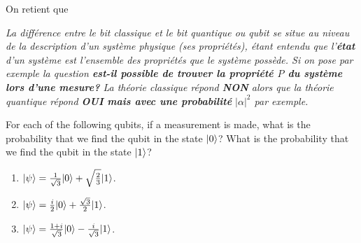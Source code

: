 On retient que

\medskip
\colorbox[gray]{0.8}{
\parbox[c]{0.9\textwidth}{
\emph{La différence entre le bit classique et le bit quantique ou qubit se situe
au niveau de la description d'un système physique (ses propriétés), étant
entendu que l'\textbf{état} d'un système est l'ensemble des propriétés que le
système possède. Si on pose par exemple la question \textbf{est-il possible de
trouver la propriété $P$ du système lors d'une mesure?} La théorie classique
répond \textbf{NON} alors que la théorie quantique répond \textbf{OUI mais avec
une probabilité} $|\alpha|^{2}$ par exemple.}
}}


\begin{exercise}
For each of the following qubits, if a measurement is made, what is the
probability that we find the qubit in the state $\vert0\rangle$? What is the
probability that we find the qubit in the state $\vert1\rangle$?
\begin{enumerate}
 \item $\vert\psi\rangle=\frac{1}{\sqrt{3}}\vert0\rangle+\sqrt{\frac{2}{3}}\vert1\rangle$.
 \item $\vert\psi\rangle=\frac{i}{2}\vert0\rangle+\frac{\sqrt{3}}{2}\vert1\rangle$.
 \item $\vert\psi\rangle=\frac{1+i}{\sqrt{3}}\vert0\rangle-\frac{i}{\sqrt{3}}\vert1\rangle$.
\end{enumerate}
\end{exercise}

